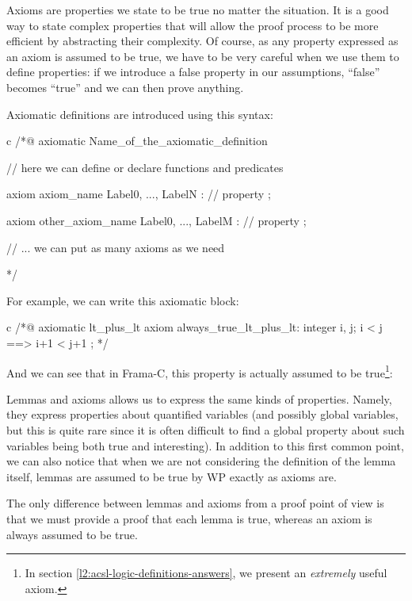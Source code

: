 Axioms are properties we state to be true no matter the situation. It is
a good way to state complex properties that will allow the proof process
to be more efficient by abstracting their complexity. Of course, as any
property expressed as an axiom is assumed to be true, we have to be very
careful when we use them to define properties: if we introduce a false
property in our assumptions, ``false'' becomes ``true'' and we can then
prove anything.




Axiomatic definitions are introduced using this syntax:


\begin{CodeBlock}{c}
/*@
  axiomatic Name_of_the_axiomatic_definition {
    // here we can define or declare functions and predicates

    axiom axiom_name { Label0, ..., LabelN }:
      // property ;

    axiom other_axiom_name { Label0, ..., LabelM }:
      // property ;

    // ... we can put as many axioms as we need
  }
*/
\end{CodeBlock}


For example, we can write this axiomatic block:


\begin{CodeBlock}{c}
/*@
  axiomatic lt_plus_lt{
    axiom always_true_lt_plus_lt:
      \forall integer i, j; i < j ==> i+1 < j+1 ;
  }
*/
\end{CodeBlock}


And we can see that in Frama-C, this property is actually assumed to be
true\footnote{In section \ref{l2:acsl-logic-definitions-answers}, we
present an {\em extremely} useful axiom.}:







Lemmas and axioms allows us to express the same kinds of properties.
Namely, they express properties about quantified variables (and possibly
global variables, but this is quite rare since it is often difficult to
find a global property about such variables being both true and
interesting). In addition to this first common point, we can also notice that
when we are not considering the definition of the lemma itself, lemmas
are assumed to be true by WP exactly as axioms are.


The only difference between lemmas and axioms from a proof point of view
is that we must provide a proof that each lemma is true, whereas an
axiom is always assumed to be true.


